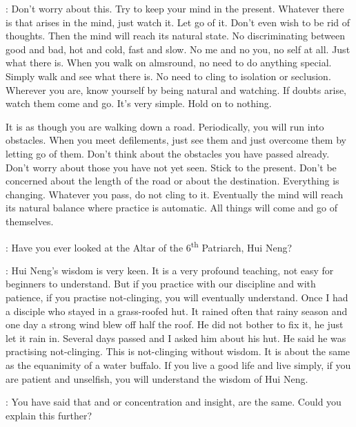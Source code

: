 : Don't worry about this. Try to keep your mind in the present. Whatever there is that arises in the mind, just watch it. Let go of it. Don't even wish to be rid of thoughts. Then the mind will reach its natural state. No discriminating between good and bad, hot and cold, fast and slow. No me and no you, no self at all. Just what there is. When you walk on almsround, no need to do anything special. Simply walk and see what there is. No need to cling to isolation or seclusion. Wherever you are, know yourself by being natural and watching. If doubts arise, watch them come and go. It's very simple. Hold on to nothing. 

It is as though you are walking down a road. Periodically, you will run into obstacles. When you meet defilements, just see them and just overcome them by letting go of them. Don't think about the obstacles you have passed already. Don't worry about those you have not yet seen. Stick to the present. Don't be concerned about the length of the road or about the destination. Everything is changing. Whatever you pass, do not cling to it. Eventually the mind will reach its natural balance where practice is automatic. All things will come and go of themselves. 

:
Have you ever looked at the Altar  of the 6\textsuperscript{th} Patriarch, Hui Neng? 

: Hui Neng's wisdom is very keen. It is a very profound teaching, not easy for beginners to understand. But if you practice with our discipline and with patience, if you practise not-clinging, you will eventually understand. Once I had a disciple who stayed in a grass-roofed hut. It rained often that rainy season and one day a strong wind blew off half the roof. He did not bother to fix it, he just let it rain in. Several days passed and I asked him about his hut. He said he was practising not-clinging. This is not-clinging without wisdom. It is about the same as the equanimity of a water buffalo. If you live a good life and live simply, if you are patient and unselfish, you will understand the wisdom of Hui Neng. 

:
You have said that  and  or concentration and insight, are the same. Could you explain this further? 

